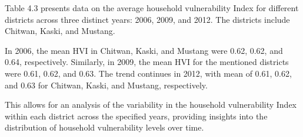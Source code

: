 \documentclass[12pt, a4paper]{article}
\begin{document}
Table 4.3 presents data on the average household vulnerability Index for different districts across three distinct years: 2006, 2009, and 2012. The districts include Chitwan, Kaski, and Mustang.

In 2006, the mean HVI in Chitwan, Kaski, and Mustang were 0.62, 0.62, and 0.64, respectively. Similarly, in 2009, the mean HVI for the mentioned districts were 0.61, 0.62, and 0.63. The trend continues in 2012, with mean of 0.61, 0.62, and 0.63 for Chitwan, Kaski, and Mustang, respectively.

This allows for an analysis of the variability in the household vulnerability Index within each district across the specified years, providing insights into the distribution of household vulnerability levels over time.
\begin{table}[H]
	\captionsetup{labelformat=empty}
	\caption{Table 4.3: District level mean and SD HVI for all waves}
	\label{tab:districtlevelhvi}
\end{table}
\end{document}
